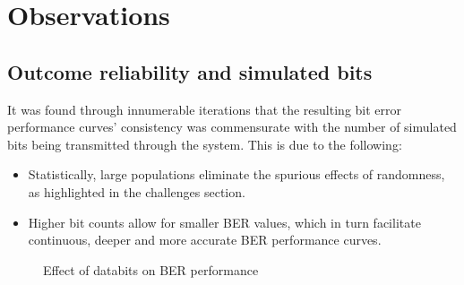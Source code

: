 \section{Observations}
\subsection{Outcome reliability and simulated bits}
It was found through innumerable iterations that the resulting bit error performance curves' consistency was commensurate with the number of simulated bits being transmitted through the system. This is due to the following:
\begin{itemize}
	\item Statistically, large populations eliminate the spurious effects of randomness, as highlighted in the challenges section.
		\item Higher bit counts allow for smaller BER values, which in turn facilitate continuous, deeper and more accurate BER performance curves.
\end{itemize}
\begin{figure}[!h]
	\centerline{}
	\caption{Effect of databits on BER performance}
	\label{res:fig:bervariation}
\end{figure}

